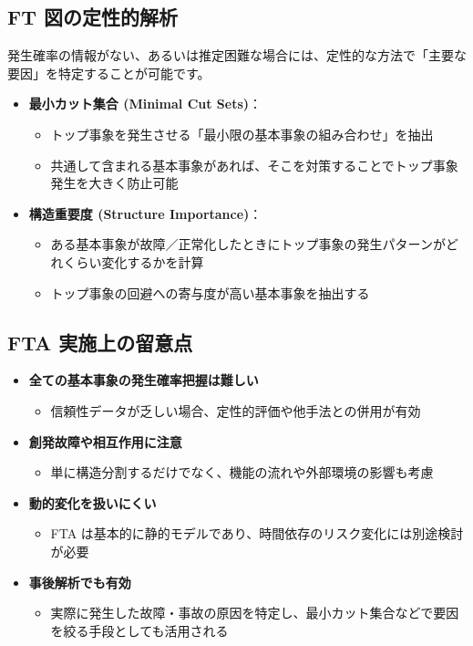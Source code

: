 \subsection{FT 図の定性的解析}

発生確率の情報がない、あるいは推定困難な場合には、定性的な方法で「主要な要因」を特定することが可能です。

\begin{itemize}
 \item \textbf{最小カット集合 (Minimal Cut Sets)}：
   \begin{itemize}
    \item トップ事象を発生させる「最小限の基本事象の組み合わせ」を抽出
    \item 共通して含まれる基本事象があれば、そこを対策することでトップ事象発生を大きく防止可能
   \end{itemize}

 \item \textbf{構造重要度 (Structure Importance)}：
   \begin{itemize}
    \item ある基本事象が故障／正常化したときにトップ事象の発生パターンがどれくらい変化するかを計算
    \item トップ事象の回避への寄与度が高い基本事象を抽出する
   \end{itemize}
\end{itemize}

\subsection{FTA 実施上の留意点}

\begin{itemize}
 \item \textbf{全ての基本事象の発生確率把握は難しい}  
   \begin{itemize}
    \item 信頼性データが乏しい場合、定性的評価や他手法との併用が有効
   \end{itemize}

 \item \textbf{創発故障や相互作用に注意}  
   \begin{itemize}
    \item 単に構造分割するだけでなく、機能の流れや外部環境の影響も考慮
   \end{itemize}

 \item \textbf{動的変化を扱いにくい}  
   \begin{itemize}
    \item FTA は基本的に静的モデルであり、時間依存のリスク変化には別途検討が必要
   \end{itemize}

 \item \textbf{事後解析でも有効}  
   \begin{itemize}
    \item 実際に発生した故障・事故の原因を特定し、最小カット集合などで要因を絞る手段としても活用される
   \end{itemize}
\end{itemize}

